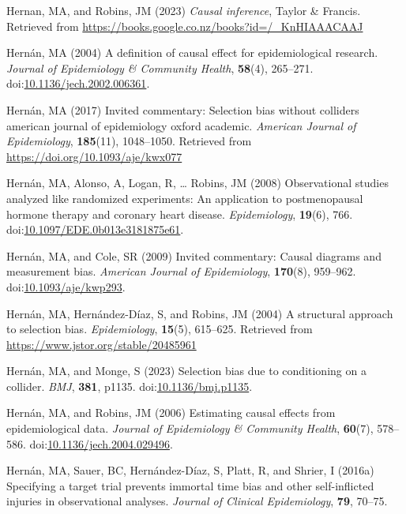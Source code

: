 \documentclass[
  singlecolumn]{article}
\newlength{\cslhangindent}
\newenvironment{CSLReferences}[2] %
 {\begin{list}{}{%
  \setlength{\itemindent}{0pt}
  \setlength{\leftmargin}{0pt}
  \setlength{\parsep}{0pt}
  \ifodd #1
   \setlength{\leftmargin}{\cslhangindent}
   \setlength{\itemindent}{-1\cslhangindent}
  \fi
  \setlength{\itemsep}{#2\baselineskip}}}
 {\end{list}}
\begin{document}
\begin{CSLReferences}{1}{0}
Hernan, MA, and Robins, JM (2023) \emph{Causal inference}, Taylor \&
Francis. Retrieved from
\url{https://books.google.co.nz/books?id=/_KnHIAAACAAJ}

Hernán, MA (2004) A definition of causal effect for epidemiological
research. \emph{Journal of Epidemiology \& Community Health},
\textbf{58}(4), 265--271.
doi:\href{https://doi.org/10.1136/jech.2002.006361}{10.1136/jech.2002.006361}.

Hernán, MA (2017) Invited commentary: Selection bias without colliders
\textbar{} american journal of epidemiology \textbar{} oxford academic.
\emph{American Journal of Epidemiology}, \textbf{185}(11), 1048--1050.
Retrieved from \url{https://doi.org/10.1093/aje/kwx077}

Hernán, MA, Alonso, A, Logan, R, \ldots{} Robins, JM (2008)
Observational studies analyzed like randomized experiments: An
application to postmenopausal hormone therapy and coronary heart
disease. \emph{Epidemiology}, \textbf{19}(6), 766.
doi:\href{https://doi.org/10.1097/EDE.0b013e3181875e61}{10.1097/EDE.0b013e3181875e61}.

Hernán, MA, and Cole, SR (2009) Invited commentary: Causal diagrams and
measurement bias. \emph{American Journal of Epidemiology},
\textbf{170}(8), 959--962.
doi:\href{https://doi.org/10.1093/aje/kwp293}{10.1093/aje/kwp293}.

Hernán, MA, Hernández-Díaz, S, and Robins, JM (2004) A structural
approach to selection bias. \emph{Epidemiology}, \textbf{15}(5),
615--625. Retrieved from \url{https://www.jstor.org/stable/20485961}

Hernán, MA, and Monge, S (2023) Selection bias due to conditioning on a
collider. \emph{BMJ}, \textbf{381}, p1135.
doi:\href{https://doi.org/10.1136/bmj.p1135}{10.1136/bmj.p1135}.

Hernán, MA, and Robins, JM (2006) Estimating causal effects from
epidemiological data. \emph{Journal of Epidemiology \& Community
Health}, \textbf{60}(7), 578--586.
doi:\href{https://doi.org/10.1136/jech.2004.029496}{10.1136/jech.2004.029496}.

Hernán, MA, Sauer, BC, Hernández-Díaz, S, Platt, R, and Shrier, I
(2016a) Specifying a target trial prevents immortal time bias and other
self-inflicted injuries in observational analyses. \emph{Journal of
Clinical Epidemiology}, \textbf{79}, 70--75.


\end{CSLReferences}
\end{document}
